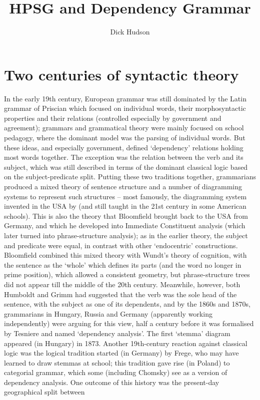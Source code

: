\documentclass[output=paper]{langsci/langscibook}
\author{Dick Hudson\affiliation{London}}
\title{HPSG and Dependency Grammar}
\begin{document}
\label{chap-dg}

\section{Two centuries of syntactic theory}

In the early 19th century, European grammar was still dominated by the Latin grammar of Priscian
which focused on individual words, their morphosyntactic properties and their relations (controlled
especially by government and agreement); grammars and grammatical theory were mainly focused on
school pedagogy, where the dominant model was the parsing of individual words. But these ideas, and
especially government, defined ‘dependency’ relations holding most words together. The exception was
the relation between the verb and its subject, which was still described in terms of the dominant
classical logic based on the subject-predicate split. Putting these two traditions together,
grammarians produced a mixed theory of sentence structure and a number of diagramming systems to
represent such structures – most famously, the diagramming system invented in the USA by \citet{RK1877a} (and still taught in the 21st century in some American schools). This is also the theory
that Bloomfield brought back to the USA from Germany, and which he developed into Immediate
Constituent analysis (which later turned into phrase-structure analysis); as in the earlier theory,
the subject and predicate were equal, in contrast with other ‘endocentric’ constructions. Bloomfield
combined this mixed theory with Wundt’s theory of cognition, with the sentence as the ‘whole’ which
defines its parts (and the word no longer in prime position), which allowed a consistent geometry,
but phrase-structure trees did not appear till the middle of the 20th century.  Meanwhile, however,
both Humboldt and Grimm had suggested that the verb was the sole head of the sentence, with the
subject as one of its dependents, and by the 1860s and 1870s, grammarians in Hungary, Russia and
Germany (apparently working independently) were arguing for this view, half a century before it was
formalised by Tesniere and named ‘dependency analysis’. The first ‘stemma’ diagram appeared (in
Hungary) in 1873.  Another 19th-century reaction against classical logic was the logical tradition
started (in Germany) by Frege, who may have learned to draw stemmas at school; this tradition gave
rise (in Poland) to categorial grammar, which some (including Chomsky) see as a version of
dependency analysis.  One outcome of this history was the present-day geographical split between
\end{document}
